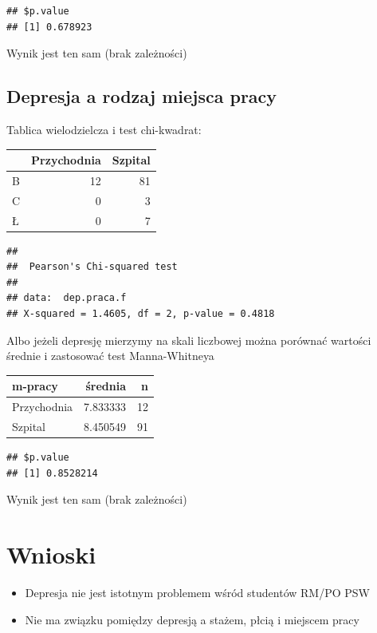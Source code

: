 \documentclass[
  openany]{book}
\begin{document}
\begin{verbatim}
## $p.value
## [1] 0.678923
\end{verbatim}

Wynik jest ten sam (brak zależności)

\hypertarget{depresja-a-rodzaj-miejsca-pracy}{%
\subsection{Depresja a rodzaj miejsca pracy}\label{depresja-a-rodzaj-miejsca-pracy}}

Tablica wielodzielcza i test chi-kwadrat:

\begin{tabular}{l|r|r}
\hline
  & Przychodnia & Szpital\\
\hline
B & 12 & 81\\
\hline
C & 0 & 3\\
\hline
Ł & 0 & 7\\
\hline
\end{tabular}

\begin{verbatim}
## 
##  Pearson's Chi-squared test
## 
## data:  dep.praca.f
## X-squared = 1.4605, df = 2, p-value = 0.4818
\end{verbatim}

Albo jeżeli depresję mierzymy na skali liczbowej
można porównać wartości średnie i zastosować test Manna-Whitneya

\begin{tabular}{l|r|r}
\hline
m-pracy & średnia & n\\
\hline
Przychodnia & 7.833333 & 12\\
\hline
Szpital & 8.450549 & 91\\
\hline
\end{tabular}

\begin{verbatim}
## $p.value
## [1] 0.8528214
\end{verbatim}

Wynik jest ten sam (brak zależności)

\hypertarget{wnioski-1}{%
\section{Wnioski}\label{wnioski-1}}

\begin{itemize}
\item
  Depresja nie jest istotnym problemem wśród studentów RM/PO PSW
\item
  Nie ma związku pomiędzy depresją a stażem, płcią i miejscem pracy
\end{itemize}
\end{document}
